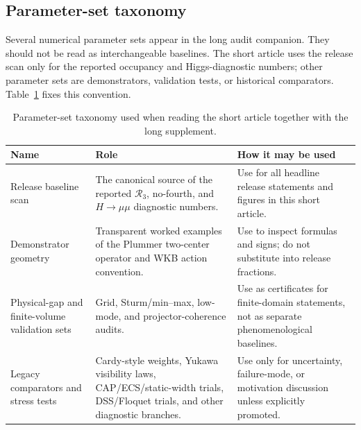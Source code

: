 \documentclass[pdflatex,sn-mathphys-num,iicol]{sn-jnl}
\newcommand{\Rthree}{\mathcal{R}_3}
\begin{document}
\subsection{Parameter-set taxonomy}

Several numerical parameter sets appear in the long audit companion.
They should not be read as interchangeable baselines.
The short article uses the release scan only for the reported occupancy and Higgs-diagnostic numbers; other parameter sets are demonstrators, validation tests, or historical comparators.
Table~\ref{tab:param_taxonomy} fixes this convention.

\begin{table}[t]
\centering
\caption{Parameter-set taxonomy used when reading the short article together with the long supplement.}
\label{tab:param_taxonomy}
\small
\setlength{\tabcolsep}{4pt}
\renewcommand{\arraystretch}{1.12}
\begin{tabular}{@{}l l l@{}}
\toprule
\parbox[t]{0.22\textwidth}{\raggedright \textbf{Name}} & \parbox[t]{0.34\textwidth}{\raggedright \textbf{Role}} & \parbox[t]{0.32\textwidth}{\raggedright \textbf{How it may be used}} \\
\midrule
\parbox[t]{0.22\textwidth}{\raggedright Release baseline scan} &
\parbox[t]{0.34\textwidth}{\raggedright The canonical source of the reported \(\Rthree\), no-fourth, and \(H\to\mu\mu\) diagnostic numbers.} &
\parbox[t]{0.32\textwidth}{\raggedright Use for all headline release statements and figures in this short article.} \\
\parbox[t]{0.22\textwidth}{\raggedright Demonstrator geometry} &
\parbox[t]{0.34\textwidth}{\raggedright Transparent worked examples of the Plummer two-center operator and WKB action convention.} &
\parbox[t]{0.32\textwidth}{\raggedright Use to inspect formulas and signs; do not substitute into release fractions.} \\
\parbox[t]{0.22\textwidth}{\raggedright Physical-gap and finite-volume validation sets} &
\parbox[t]{0.34\textwidth}{\raggedright Grid, Sturm/min--max, low-mode, and projector-coherence audits.} &
\parbox[t]{0.32\textwidth}{\raggedright Use as certificates for finite-domain statements, not as separate phenomenological baselines.} \\
\parbox[t]{0.22\textwidth}{\raggedright Legacy comparators and stress tests} &
\parbox[t]{0.34\textwidth}{\raggedright Cardy-style weights, Yukawa visibility laws, CAP/ECS/static-width trials, DSS/Floquet trials, and other diagnostic branches.} &
\parbox[t]{0.32\textwidth}{\raggedright Use only for uncertainty, failure-mode, or motivation discussion unless explicitly promoted.} \\
\bottomrule
\end{tabular}
\end{table}
\end{document}
